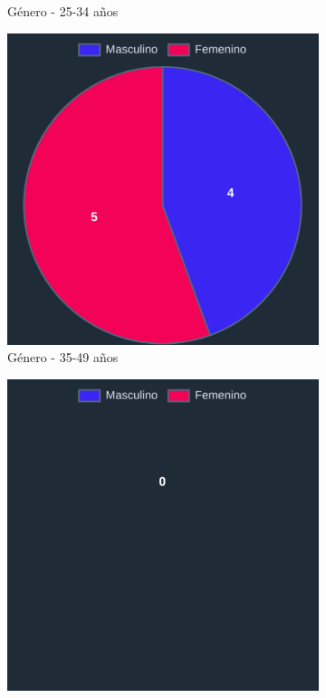 \begin{figure}[H]
\begin{subfigure}{0.3\textwidth}
  \caption{Género - 25-34 años}
  \end{subfigure}
  \begin{subfigure}{0.3\textwidth}
   \includegraphics[width=\textwidth]{imaxes/capturas-app/graficos/modaresi/grafico-genero-v.png}
  \caption{Género - 35-49 años}
  \end{subfigure}
  \begin{subfigure}{0.3\textwidth}
   \includegraphics[width=\textwidth]{imaxes/capturas-app/graficos/modaresi/grafico-genero-vv.png}

\end{subfigure}
\end{figure}
